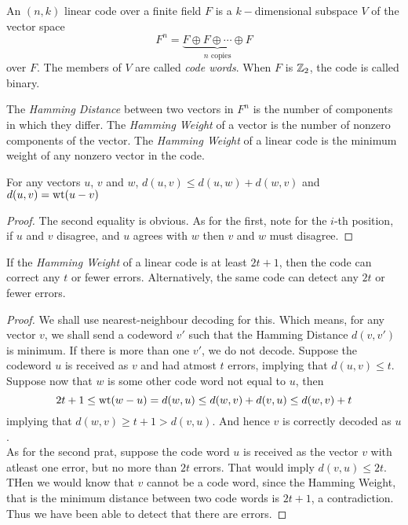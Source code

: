 \begin{definition}
	An $(n,k)$ linear code over a finite field $F$ is a $k-$dimensional subspace $V$ of the vector space
	\begin{equation*}
		F^n = \underbrace{F\oplus F\oplus\cdots\oplus F}_{n\text{ copies}}
	\end{equation*}
	over $F$. The members of $V$ are called \textit{code words}. When $F$ is $\mathbb{Z}_2$, the code is called binary.
\end{definition}

\begin{definition}
	The \textit{Hamming Distance} between two vectors in $F^n$ is the number of components in which they differ. The \textit{Hamming Weight} of a vector is the number of nonzero components of the vector. The \textit{Hamming Weight} of a linear code is the minimum weight of any nonzero vector in the code.
\end{definition}

\begin{proposition}
	For any vectors $u$, $v$ and $w$, $d(u,v)\le d(u,w)+d(w,v)$ and $d(u,v) = \operatorname{wt}(u-v)$
\end{proposition}
\begin{proof}
	The second equality is obvious. As for the first, note for the $i$-th position, if $u$ and $v$ disagree, and $u$ agrees with $w$ then $v$ and $w$ must disagree.
\end{proof}

\begin{proposition}
	If the \textit{Hamming Weight} of a linear code is at least $2t+1$, then the code can correct any $t$ or fewer errors. Alternatively, the same code can detect any $2t$ or fewer errors.
\end{proposition}
\begin{proof}
	We shall use nearest-neighbour decoding for this. Which means, for any vector $v$, we shall send a codeword $v'$ such that the Hamming Distance $d(v,v')$ is minimum. If there is more than one $v'$, we do not decode. Suppose the codeword $u$ is received as $v$ and had atmost $t$ errors, implying that $d(u,v)\le t$. Suppose now that $w$ is some other code word not equal to $u$, then
	\begin{equation*}
		2t+1\le\operatorname{wt}(w-u) = d(w, u) \le d(w,v) + d(v,u) \le d(w,v) + t
	\end{equation*}
	implying that $d(w,v)\ge t+1>d(v,u)$. And hence $v$ is correctly decoded as $u$.\\
	As for the second prat, suppose the code word $u$ is received as the vector $v$ with atleast one error, but no more than $2t$ errors. That would imply $d(v,u)\le 2t$. THen we would know that $v$ cannot be a code word, since the Hamming Weight, that is the minimum distance between two code words is $2t+1$, a contradiction. Thus we have been able to detect that there are errors.
\end{proof}

